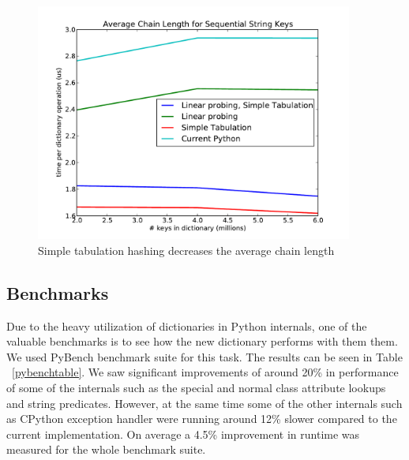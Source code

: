 \documentclass[11pt]{article}
\begin{document}
\begin{figure}[H]
  \centering
  \includegraphics[width=4.1in]{chainlength.pdf}
  \caption{Simple tabulation hashing decreases the average chain length}
  \label{fig:chainlength}
\end{figure}

\subsection{Benchmarks}
Due to the heavy utilization of dictionaries in Python internals, one of the
valuable benchmarks is to see how the new dictionary performs with them them. We used
PyBench benchmark suite for this task. The results can be seen in Table
~\ref{pybenchtable}.  We saw significant improvements of around
20\% in performance of some of the internals such as the special and normal
class attribute lookups and string predicates. However, at the same time some
of the other internals such as CPython exception handler were running around
12\% slower compared to the current implementation. On average a 4.5\% improvement in runtime was measured for the whole benchmark suite.
\end{document}
